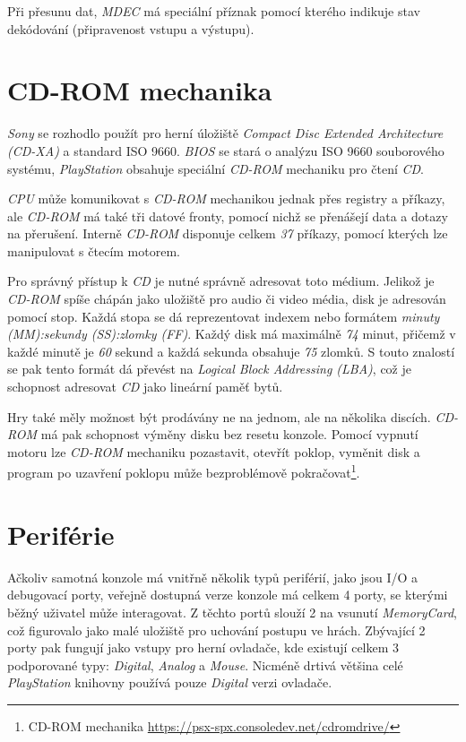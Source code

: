 Při přesunu dat, \textit{MDEC} má speciální příznak pomocí kterého indikuje stav dekódování (připravenost vstupu a výstupu).

\section{CD-ROM mechanika}

\textit{Sony} se rozhodlo použít pro herní úložiště \textit{Compact Disc Extended Architecture (CD-XA)} a standard ISO 9660.
\textit{BIOS} se stará o analýzu ISO 9660 souborového systému, \textit{PlayStation} obsahuje speciální \textit{CD-ROM} mechaniku
pro čtení \textit{CD}.

\textit{CPU} může komunikovat s \textit{CD-ROM} mechanikou jednak přes registry a příkazy, ale \textit{CD-ROM} má také tři datové fronty,
pomocí nichž se přenášejí data a dotazy na přerušení. Interně \textit{CD-ROM} disponuje celkem \textit{37} příkazy, pomocí kterých
lze manipulovat s čtecím motorem.

Pro správný přístup k \textit{CD} je nutné správně adresovat toto médium. Jelikož je \textit{CD-ROM} spíše chápán jako
uložiště pro audio či video média, disk je adresován pomocí stop. Každá stopa se dá reprezentovat indexem
nebo formátem \textit{minuty (MM):sekundy (SS):zlomky (FF)}. Každý disk má maximálně \textit{74} minut, přičemž v každé minutě
je \textit{60} sekund a každá sekunda obsahuje \textit{75} zlomků. S touto znalostí se pak tento 
formát dá převést na \textit{Logical Block Addressing (LBA)}, což je schopnost adresovat \textit{CD} jako lineární paměť bytů.

Hry také měly možnost být prodávány ne na jednom, ale na několika discích. \textit{CD-ROM} má pak schopnost výměny disku
bez resetu konzole. Pomocí vypnutí motoru lze \textit{CD-ROM} mechaniku pozastavit, otevřít poklop, vyměnit disk
a program po uzavření poklopu může bezproblémově pokračovat\footnote{CD-ROM mechanika\cite{PSXSpec} \url{https://psx-spx.consoledev.net/cdromdrive/}}.

\section{Periférie}

Ačkoliv samotná konzole má vnitřně několik typů periférií, jako jsou I/O a debugovací porty, veřejně dostupná verze konzole má celkem 4 porty, 
se kterými běžný uživatel může interagovat. Z těchto portů slouží 2 na vsunutí \textit{MemoryCard}, 
což figurovalo jako malé uložiště pro uchování postupu ve hrách. 
Zbývající 2 porty pak fungují jako vstupy pro herní ovladače, kde existují celkem 3 podporované typy: \textit{Digital}, \textit{Analog} a \textit{Mouse}. 
Nicméně drtivá většina celé \textit{PlayStation} knihovny používá pouze \textit{Digital} verzi ovladače.

